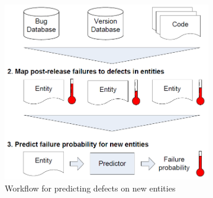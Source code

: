  \begin{figure}[H]
     \begin{subfigure}{.5\textwidth}
         \centering
         \includegraphics[scale=0.3]{./src/mining_metrics_overview.png}
         \caption{Workflow for predicting defects on new entities}\label{mining:overview}
     \end{subfigure}%
     \begin{subfigure}{.5\textwidth}
         \centering

\end{subfigure}
\end{figure}
